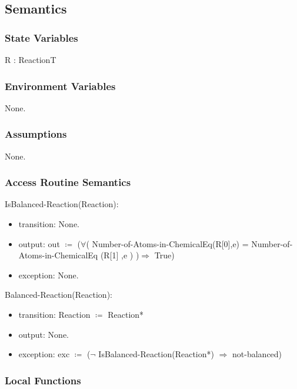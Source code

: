 \documentclass[12pt, titlepage]{article}
\begin{document}
\subsection{Semantics}

\subsubsection{State Variables}

R : ReactionT

\subsubsection{Environment Variables}

None.

\subsubsection{Assumptions}

None.

\subsubsection{Access Routine Semantics}

\noindent IsBalanced-Reaction(Reaction):
\begin{itemize}
\item transition: None.
\item output: out $\coloneqq$ ($\forall$( Number-of-Atoms-in-ChemicalEq(R[0],e)  = Number-of-Atoms-in-ChemicalEq (R[1] ,e ) )$\Rightarrow$ True)
\item exception: None.
\end{itemize}

\noindent Balanced-Reaction(Reaction):
\begin{itemize}
\item transition: Reaction $\coloneqq$ Reaction*
\item output: None. 
\item exception: exc $\coloneqq$  ($\neg$ IsBalanced-Reaction(Reaction*) $\Rightarrow$ not-balanced)
\end{itemize}


\subsubsection{Local Functions}
\end{document}
